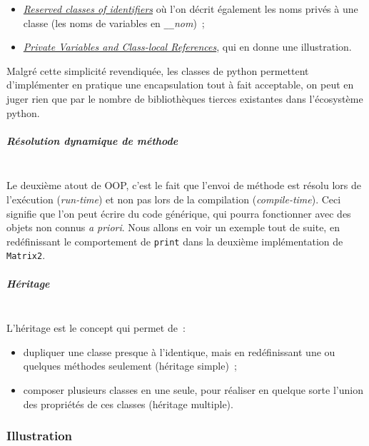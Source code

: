 \begin{itemize}
\tightlist
\item
  \href{https://docs.python.org/3/reference/lexical_analysis.html\#reserved-classes-of-identifiers}{\emph{Reserved
  classes of identifiers}} où l'on décrit également les noms privés à
  une classe (les noms de variables en \texttt{\_\_}\emph{nom})~;
\item
  \href{https://docs.python.org/3/tutorial/classes.html\#tut-private}{\emph{Private
  Variables and Class-local References}}, qui en donne une illustration.
\end{itemize}

Malgré cette simplicité revendiquée, les classes de python permettent
d'implémenter en pratique une encapsulation tout à fait acceptable, on
peut en juger rien que par le nombre de bibliothèques tierces existantes
dans l'écosystème python.

    \hypertarget{ruxe9solution-dynamique-de-muxe9thode}{%
\subparagraph{Résolution dynamique de
méthode\\\\}\label{ruxe9solution-dynamique-de-muxe9thode}}

    Le deuxième atout de OOP, c'est le fait que l'envoi de méthode est
résolu lors de l'exécution (\emph{run-time}) et non pas lors de la
compilation (\emph{compile-time}). Ceci signifie que l'on peut écrire du
code générique, qui pourra fonctionner avec des objets non connus
\emph{a priori}. Nous allons en voir un exemple tout de suite, en
redéfinissant le comportement de \texttt{print} dans la deuxième
implémentation de \texttt{Matrix2}.

    \hypertarget{huxe9ritage}{%
\subparagraph{Héritage\\\\}\label{huxe9ritage}}

    L'héritage est le concept qui permet de~:

\begin{itemize}
\tightlist
\item
  dupliquer une classe presque à l'identique, mais en redéfinissant une
  ou quelques méthodes seulement (héritage simple)~;
\item
  composer plusieurs classes en une seule, pour réaliser en quelque
  sorte l'union des propriétés de ces classes (héritage multiple).
\end{itemize}

    \hypertarget{illustration}{%
\subsubsection{Illustration}\label{illustration}}

